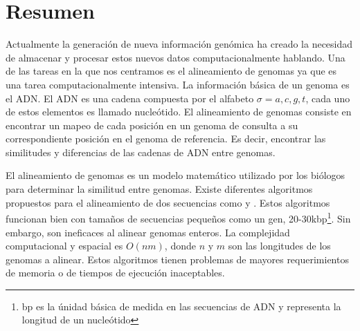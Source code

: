 \documentclass[12pt,a4paper]{article}
\begin{document}
\section{Resumen}
\indent
Actualmente la generación de nueva información genómica ha creado la necesidad de almacenar y procesar estos nuevos datos computacionalmente hablando. Una de las tareas en la que nos centramos es el alineamiento de genomas ya que es una tarea computacionalmente intensiva. La información básica de un genoma es el ADN. El ADN es una cadena compuesta por el alfabeto $\sigma={a,c,g,t}$, cada uno de estos elementos es llamado nucleótido. El alineamiento de genomas consiste en encontrar un mapeo de cada posición en un genoma de consulta a su correspondiente posición en el genoma de referencia. Es decir, encontrar las similitudes y diferencias de las cadenas de ADN entre genomas.

El alineamiento de genomas es un modelo matemático utilizado por los biólogos para determinar la similitud entre genomas. Existe diferentes algoritmos propuestos para el alineamiento de dos secuencias como \cite{Needleman1970General} y \cite{Waterman}. Estos algoritmos funcionan bien con tamaños de secuencias pequeños como un gen, 20-30kbp\footnote{bp es la únidad básica de medida en las secuencias de ADN y representa la longitud de un nucleótido}. Sin embargo, son ineficaces al alinear genomas enteros. La complejidad computacional y espacial es $O(nm)$, donde $n$ y $m$ son las longitudes de los genomas a alinear. Estos algoritmos tienen problemas de mayores requerimientos de memoria o de tiempos de ejecución inaceptables.
\end{document}

